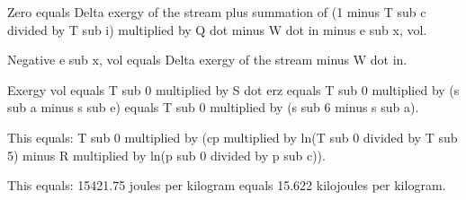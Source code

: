 Zero equals Delta exergy of the stream plus summation of (1 minus T sub c divided by T sub i) multiplied by Q dot minus W dot in minus e sub x, vol.  

Negative e sub x, vol equals Delta exergy of the stream minus W dot in.  

Exergy vol equals T sub 0 multiplied by S dot erz equals T sub 0 multiplied by (s sub a minus s sub e) equals T sub 0 multiplied by (s sub 6 minus s sub a).  

This equals:  
T sub 0 multiplied by (cp multiplied by ln(T sub 0 divided by T sub 5) minus R multiplied by ln(p sub 0 divided by p sub c)).  

This equals:  
15421.75 joules per kilogram equals 15.622 kilojoules per kilogram.